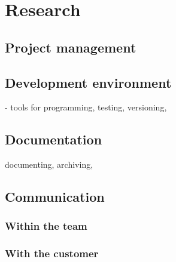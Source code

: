 \chapter{Research}
\section{Project management}
\section{Development environment}
- tools for programming, testing, versioning, 
\section{Documentation}
documenting, archiving, 


\section{Communication}
\subsection{Within the team}
\subsection{With the customer}
